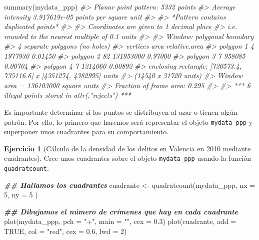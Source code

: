 \documentclass[
]{book}
\newenvironment{Shaded}{\begin{snugshade}}{\end{snugshade}}
\newcommand{\AttributeTok}[1]{\textcolor[rgb]{0.77,0.63,0.00}{#1}}
\newcommand{\CommentTok}[1]{\textcolor[rgb]{0.56,0.35,0.01}{\textit{#1}}}
\newcommand{\ConstantTok}[1]{\textcolor[rgb]{0.00,0.00,0.00}{#1}}
\newcommand{\DecValTok}[1]{\textcolor[rgb]{0.00,0.00,0.81}{#1}}
\newcommand{\DocumentationTok}[1]{\textcolor[rgb]{0.56,0.35,0.01}{\textbf{\textit{#1}}}}
\newcommand{\FloatTok}[1]{\textcolor[rgb]{0.00,0.00,0.81}{#1}}
\newcommand{\FunctionTok}[1]{\textcolor[rgb]{0.00,0.00,0.00}{#1}}
\newcommand{\NormalTok}[1]{#1}
\newcommand{\OtherTok}[1]{\textcolor[rgb]{0.56,0.35,0.01}{#1}}
\newcommand{\StringTok}[1]{\textcolor[rgb]{0.31,0.60,0.02}{#1}}
\theoremstyle{definition}
\theoremstyle{definition}
\theoremstyle{definition}
\newtheorem{exercise}{Ejercicio}[chapter]
\theoremstyle{definition}
\theoremstyle{remark}
\begin{document}
\begin{Shaded}
\begin{Highlighting}[]
\FunctionTok{summary}\NormalTok{(mydata\_ppp)}
\CommentTok{\#\textgreater{} Planar point pattern:  5332 points}
\CommentTok{\#\textgreater{} Average intensity 3.917619e{-}05 points per square unit}
\CommentTok{\#\textgreater{} }
\CommentTok{\#\textgreater{} *Pattern contains duplicated points*}
\CommentTok{\#\textgreater{} }
\CommentTok{\#\textgreater{} Coordinates are given to 1 decimal place}
\CommentTok{\#\textgreater{} i.e. rounded to the nearest multiple of 0.1 units}
\CommentTok{\#\textgreater{} }
\CommentTok{\#\textgreater{} Window: polygonal boundary}
\CommentTok{\#\textgreater{} 4 separate polygons (no holes)}
\CommentTok{\#\textgreater{}            vertices      area relative.area}
\CommentTok{\#\textgreater{} polygon 1         4   1977930       0.01450}
\CommentTok{\#\textgreater{} polygon 2        82 131953000       0.97000}
\CommentTok{\#\textgreater{} polygon 3         7    958085       0.00704}
\CommentTok{\#\textgreater{} polygon 4         7   1214060       0.00892}
\CommentTok{\#\textgreater{} enclosing rectangle: [720573.4, 735116.6] x [4351274, 4382995] units}
\CommentTok{\#\textgreater{}                      (14540 x 31720 units)}
\CommentTok{\#\textgreater{} Window area = 136103000 square units}
\CommentTok{\#\textgreater{} Fraction of frame area: 0.295}
\CommentTok{\#\textgreater{} }
\CommentTok{\#\textgreater{} *** 6 illegal points stored in attr(,"rejects") ***}
\end{Highlighting}
\end{Shaded}

Es importante determinar si los puntos se distribuyen al azar o tienen algún
patrón. Por ello, lo primero que haremos será representar el objeto \texttt{mydata\_ppp}
y superponer unos cuadrantes para su comportamiento.

\begin{exercise}[Cálculo de la densidad de los delitos en Valencia en 2010 mediante cuadrantes]
\protect\hypertarget{exr:ex32}{}\label{exr:ex32}Cree unos cuadrantes sobre el objeto \texttt{mydata\_ppp} usando la función
\texttt{quadratcount}.
\end{exercise}

\begin{Shaded}
\begin{Highlighting}[]
\DocumentationTok{\#\# Hallamos los cuadrantes}
\NormalTok{cuadrante }\OtherTok{\textless{}{-}} \FunctionTok{quadratcount}\NormalTok{(mydata\_ppp,}
  \AttributeTok{nx =} \DecValTok{5}\NormalTok{,}
  \AttributeTok{ny =} \DecValTok{5}
\NormalTok{)}

\DocumentationTok{\#\# Dibujamos el número de crímenes que hay en cada cuadrante}
\FunctionTok{plot}\NormalTok{(mydata\_ppp, }\AttributeTok{pch =} \StringTok{"+"}\NormalTok{, }\AttributeTok{main =} \StringTok{""}\NormalTok{, }\AttributeTok{cex =} \FloatTok{0.3}\NormalTok{)}
\FunctionTok{plot}\NormalTok{(cuadrante, }\AttributeTok{add =} \ConstantTok{TRUE}\NormalTok{, }\AttributeTok{col =} \StringTok{"red"}\NormalTok{, }\AttributeTok{cex =} \FloatTok{0.6}\NormalTok{, }\AttributeTok{lwd =} \DecValTok{2}\NormalTok{)}
\end{Highlighting}
\end{Shaded}
\end{document}
